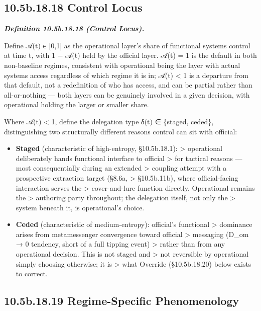 \documentclass[
]{article}
\begin{document}
\hypertarget{b.18.18-control-locus}{%
\subsection{10.5b.18.18 Control Locus}\label{b.18.18-control-locus}}

\emph{\textbf{Definition 10.5b.18.18 (Control Locus).}}

Define 𝒜(t) ∈ {[}0,1{]} as the operational layer's share of functional
systems control at time t, with 1 − 𝒜(t) held by the official layer.
𝒜(t) = 1 is the default in both non-baseline regimes, consistent with
operational being the layer with actual systems access regardless of
which regime it is in; 𝒜(t) \textless{} 1 is a departure from that
default, not a redefinition of who has access, and can be partial rather
than all-or-nothing --- both layers can be genuinely involved in a given
decision, with operational holding the larger or smaller share.

Where 𝒜(t) \textless{} 1, define the delegation type δ(t) ∈ \{staged,
ceded\}, distinguishing two structurally different reasons control can
sit with official:

\begin{itemize}
\item
  \textbf{Staged} (characteristic of high-entropy, §10.5b.18.1):
  \textgreater{} operational deliberately hands functional interface to
  official \textgreater{} for tactical reasons --- most consequentially
  during an extended \textgreater{} coupling attempt with a prospective
  extraction target (§8.6a, \textgreater{} §10.5b.11b), where
  official-facing interaction serves the \textgreater{} cover-and-lure
  function directly. Operational remains the \textgreater{} authoring
  party throughout; the delegation itself, not only the \textgreater{}
  system beneath it, is operational's choice.
\item
  \textbf{Ceded} (characteristic of medium-entropy): official's
  functional \textgreater{} dominance arises from metamessenger
  convergence toward official \textgreater{} messaging (D\_om → 0
  tendency, short of a full tipping event) \textgreater{} rather than
  from any operational decision. This is not staged and \textgreater{}
  not reversible by operational simply choosing otherwise; it is
  \textgreater{} what Override (§10.5b.18.20) below exists to correct.
\end{itemize}

\hypertarget{b.18.19-regime-specific-phenomenology}{%
\subsection{10.5b.18.19 Regime-Specific
Phenomenology}\label{b.18.19-regime-specific-phenomenology}}
\end{document}
